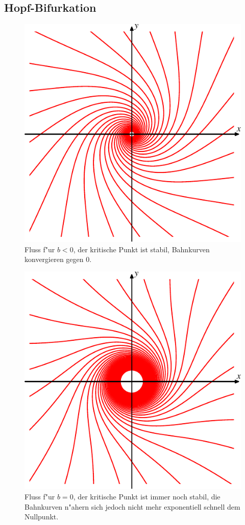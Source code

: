 \subsection{Hopf-Bifurkation}
\begin{figure}
\centering
\includegraphics{chapters/images/hopf-1.pdf}
\caption{Fluss f"ur $b<0$, der kritische Punkt ist stabil,
Bahnkurven konvergieren gegen $0$.
\label{geometrie:hopf1}}
\end{figure}%
\begin{figure}
\centering
\includegraphics{chapters/images/hopf-2.pdf}
\caption{Fluss f"ur $b=0$, der kritische Punkt ist immer noch stabil,
die Bahnkurven n"ahern sich jedoch nicht mehr exponentiell schnell
dem Nullpunkt.
\label{geometrie:hopf2}}
\end{figure}%
